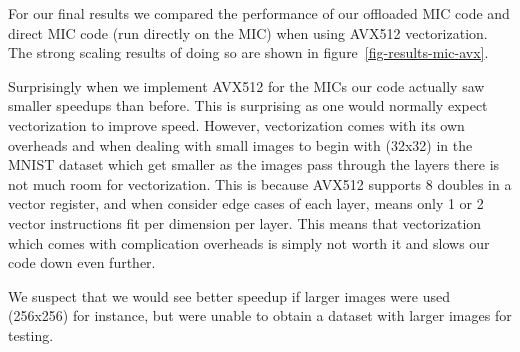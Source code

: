 For our final results we compared the performance of our offloaded MIC code and direct MIC code (run directly on the MIC) when using AVX512 vectorization. The strong scaling results of doing so are shown in figure~\ref{fig-results-mic-avx}.

Surprisingly when we implement AVX512 for the MICs our code actually saw smaller speedups than before. This is surprising as one would normally expect vectorization to improve speed. However, vectorization comes with its own overheads and when dealing with small images to begin with (32x32) in the MNIST dataset which get smaller as the images pass through the layers there is not much room for vectorization. This is because AVX512 supports 8 doubles in a vector register, and when consider edge cases of each layer, means only 1 or 2 vector instructions fit per dimension per layer. This means that vectorization which comes with complication overheads is simply not worth it and slows our code down even further.

We suspect that we would see better speedup if larger images were used (256x256) for instance, but were unable to obtain a dataset with larger images for testing.
